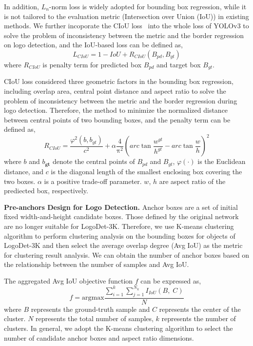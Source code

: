 \documentclass[journal]{IEEEtran}
\begin{document}
In addition, $L_{n}$-norm loss is widely adopted for bounding box regression, while it is not tailored to the evaluation metric (Intersection over Union (IoU)) in existing methods. We further incoporate the CIoU loss~\cite{Zheng2020Distance} into the whole loss of YOLOv3 to solve the problem of inconsistency between the metric and the border regression on logo detection, and the IoU-based loss can be defined as,
\begin{equation}
L_{CIoU}=1-IoU+R_{CIoU}(B_{pd},B_{gt})
\end{equation}
where $R_{CIoU}$ is penalty term for predicted box $B_{pd}$ and target box $B_{gt}$.  

CIoU loss considered three geometric factors in the bounding box regression, including overlap area, central point distance and aspect ratio to solve the problem of inconsistency between the metric and the border regression during logo detection. Therefore, the method to minimize the normalized distance between central points of two bounding boxes, and the penalty term can be defined as,
\begin{equation}
R_{CIoU}=\frac{\varphi^2(b,b_{gt})}{c^2}+\alpha\frac4{\mathrm\pi^2}{(arc\tan\frac{w^{gt}}{h^{gt}}-arc\tan\frac wh)}^2	
\end{equation}
where $b$ and $b_{\mathbf g\mathbf t}$ denote the central points of $B_{pd}$ and $B_{gt}$, $\varphi(\cdot)$ is the Euclidean distance, and $c$ is the diagonal length of the smallest enclosing box covering the two boxes. $\alpha$ is a positive trade-off parameter. $w$, $h$ are aspect ratio of the prediected box, respectively.

\textbf{Pre-anchors Design for Logo Detection.} Anchor boxes are a set of initial fixed width-and-height candidate boxes. Those defined by the original network are no longer suitable for LogoDet-3K. Therefore, we use K-means clustering algorithm to perform clustering analysis on the bounding boxes for objects of LogoDet-3K and then select the average overlap degree (Avg IoU) as the metric for clustering result analysis.  We can obtain the number of anchor boxes based on the relationship between the number of samples and Avg IoU.

The aggregated Avg IoU objective function $f$ can be expressed as,
\begin{equation}
f=\mathrm{argmax}\frac{{\displaystyle\sum_{i=1}^k}{\displaystyle\sum_{j=1}^{N_k}}I_{IoU}\left(B,\;C\right)}N
\end{equation}
where $B$ represents the ground-truth sample and $C$ represents the center of the cluster. $N$ represents the total number of samples, $k$ represents the number of clusters. In general, we adopt the K-means clustering algorithm to select the number of candidate anchor boxes and aspect ratio dimensions. 
\end{document}
